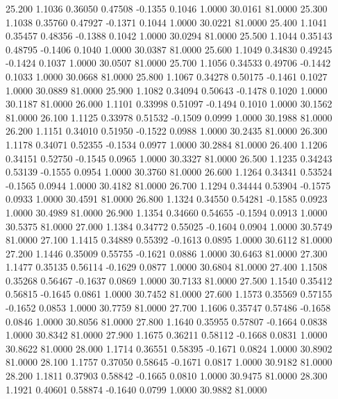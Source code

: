   25.200   1.1036   0.36050   0.47508  -0.1355   0.1046   1.0000  30.0161  81.0000
  25.300   1.1038   0.35760   0.47927  -0.1371   0.1044   1.0000  30.0221  81.0000
  25.400   1.1041   0.35457   0.48356  -0.1388   0.1042   1.0000  30.0294  81.0000
  25.500   1.1044   0.35143   0.48795  -0.1406   0.1040   1.0000  30.0387  81.0000
  25.600   1.1049   0.34830   0.49245  -0.1424   0.1037   1.0000  30.0507  81.0000
  25.700   1.1056   0.34533   0.49706  -0.1442   0.1033   1.0000  30.0668  81.0000
  25.800   1.1067   0.34278   0.50175  -0.1461   0.1027   1.0000  30.0889  81.0000
  25.900   1.1082   0.34094   0.50643  -0.1478   0.1020   1.0000  30.1187  81.0000
  26.000   1.1101   0.33998   0.51097  -0.1494   0.1010   1.0000  30.1562  81.0000
  26.100   1.1125   0.33978   0.51532  -0.1509   0.0999   1.0000  30.1988  81.0000
  26.200   1.1151   0.34010   0.51950  -0.1522   0.0988   1.0000  30.2435  81.0000
  26.300   1.1178   0.34071   0.52355  -0.1534   0.0977   1.0000  30.2884  81.0000
  26.400   1.1206   0.34151   0.52750  -0.1545   0.0965   1.0000  30.3327  81.0000
  26.500   1.1235   0.34243   0.53139  -0.1555   0.0954   1.0000  30.3760  81.0000
  26.600   1.1264   0.34341   0.53524  -0.1565   0.0944   1.0000  30.4182  81.0000
  26.700   1.1294   0.34444   0.53904  -0.1575   0.0933   1.0000  30.4591  81.0000
  26.800   1.1324   0.34550   0.54281  -0.1585   0.0923   1.0000  30.4989  81.0000
  26.900   1.1354   0.34660   0.54655  -0.1594   0.0913   1.0000  30.5375  81.0000
  27.000   1.1384   0.34772   0.55025  -0.1604   0.0904   1.0000  30.5749  81.0000
  27.100   1.1415   0.34889   0.55392  -0.1613   0.0895   1.0000  30.6112  81.0000
  27.200   1.1446   0.35009   0.55755  -0.1621   0.0886   1.0000  30.6463  81.0000
  27.300   1.1477   0.35135   0.56114  -0.1629   0.0877   1.0000  30.6804  81.0000
  27.400   1.1508   0.35268   0.56467  -0.1637   0.0869   1.0000  30.7133  81.0000
  27.500   1.1540   0.35412   0.56815  -0.1645   0.0861   1.0000  30.7452  81.0000
  27.600   1.1573   0.35569   0.57155  -0.1652   0.0853   1.0000  30.7759  81.0000
  27.700   1.1606   0.35747   0.57486  -0.1658   0.0846   1.0000  30.8056  81.0000
  27.800   1.1640   0.35955   0.57807  -0.1664   0.0838   1.0000  30.8342  81.0000
  27.900   1.1675   0.36211   0.58112  -0.1668   0.0831   1.0000  30.8622  81.0000
  28.000   1.1714   0.36551   0.58395  -0.1671   0.0824   1.0000  30.8902  81.0000
  28.100   1.1757   0.37050   0.58645  -0.1671   0.0817   1.0000  30.9182  81.0000
  28.200   1.1811   0.37903   0.58842  -0.1665   0.0810   1.0000  30.9475  81.0000
  28.300   1.1921   0.40601   0.58874  -0.1640   0.0799   1.0000  30.9882  81.0000
